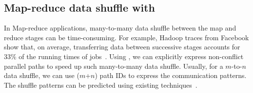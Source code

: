%
%
%
%
%

\subsection{Map-reduce data shuffle with \sys}\label{mapreduce}
In Map-reduce applications, many-to-many data shuffle between the map and reduce stages can be time-consuming. For example, Hadoop traces from Facebook show that, on average, transferring data between successive stages accounts for $33\%$ of the running times of jobs~\cite{orchestra}. Using \sys, we can explicitly express non-conflict parallel paths to speed up such many-to-many data shuffle. Usually, for a $m$-to-$n$ data shuffle, we can use ($m$+$n$) path IDs to express the communication patterns. The shuffle patterns can be predicted using existing techniques~\cite{hadoopwatch}.


